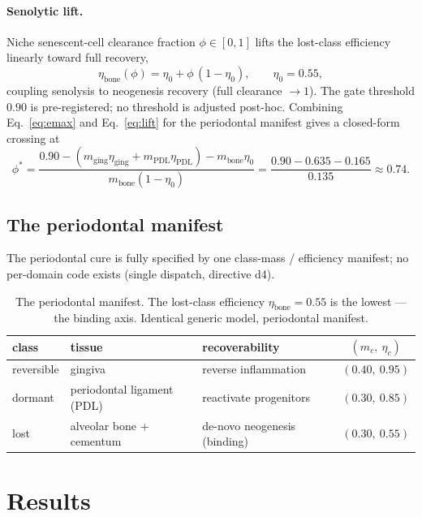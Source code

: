 \documentclass[11pt,a4paper]{article}
\begin{document}
\paragraph{Senolytic lift.} Niche senescent-cell clearance fraction $\phi\in[0,1]$
lifts the lost-class efficiency linearly toward full recovery,
\begin{equation}
\eta_{\text{bone}}(\phi) = \eta_0 + \phi\,(1-\eta_0), \qquad \eta_0 = 0.55,
\label{eq:lift}
\end{equation}
coupling senolysis to neogenesis recovery (full clearance $\to 1$). The gate
threshold $0.90$ is pre-registered; no threshold is adjusted post-hoc. Combining
Eq.~\eqref{eq:emax} and Eq.~\eqref{eq:lift} for the periodontal manifest gives a
closed-form crossing at
\[
\phi^\ast = \frac{0.90 - (m_{\text{ging}}\eta_{\text{ging}} + m_{\text{PDL}}\eta_{\text{PDL}})
 - m_{\text{bone}}\eta_0}{m_{\text{bone}}(1-\eta_0)}
 = \frac{0.90 - 0.635 - 0.165}{0.135} \approx 0.74 .
\]

\subsection{The periodontal manifest}
\label{sec:manifest}
The periodontal cure is fully specified by one class-mass / efficiency manifest; no
per-domain code exists (single dispatch, directive d4).

\begin{table}[h]\centering\small
\begin{tabular}{lllc}
\toprule
\textbf{class} & \textbf{tissue} & \textbf{recoverability} & $(m_c,\ \eta_c)$ \\
\midrule
reversible & gingiva & reverse inflammation & $(0.40,\ 0.95)$ \\
dormant & periodontal ligament (PDL) & reactivate progenitors \citep{seo2004} & $(0.30,\ 0.85)$ \\
lost & alveolar bone + cementum & de-novo neogenesis (binding) & $(0.30,\ 0.55)$ \\
\bottomrule
\end{tabular}
\caption{The periodontal manifest. The lost-class efficiency $\eta_{\text{bone}}=0.55$
is the lowest --- the binding axis. Identical generic model, periodontal manifest.}
\label{tab:manifest}
\end{table}

\section{Results}
\label{sec:results}
\end{document}
